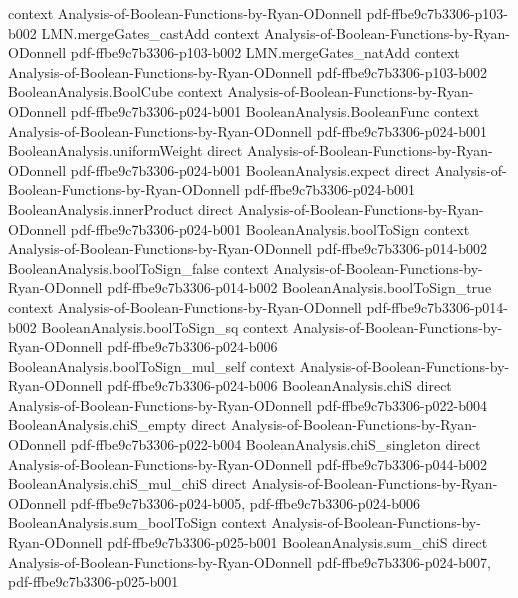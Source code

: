 \begin{lemma}
  {context}
  {Analysis-of-Boolean-Functions-by-Ryan-ODonnell}
  {pdf-ffbe9c7b3306-p103-b002}
\proofstep
  {LMN.mergeGates_castAdd}
  {context}
  {Analysis-of-Boolean-Functions-by-Ryan-ODonnell}
  {pdf-ffbe9c7b3306-p103-b002}
\proofstep
  {LMN.mergeGates_natAdd}
  {context}
  {Analysis-of-Boolean-Functions-by-Ryan-ODonnell}
  {pdf-ffbe9c7b3306-p103-b002}
\proofstep
  {BooleanAnalysis.BoolCube}
  {context}
  {Analysis-of-Boolean-Functions-by-Ryan-ODonnell}
  {pdf-ffbe9c7b3306-p024-b001}
\proofstep
  {BooleanAnalysis.BooleanFunc}
  {context}
  {Analysis-of-Boolean-Functions-by-Ryan-ODonnell}
  {pdf-ffbe9c7b3306-p024-b001}
\proofstep
  {BooleanAnalysis.uniformWeight}
  {direct}
  {Analysis-of-Boolean-Functions-by-Ryan-ODonnell}
  {pdf-ffbe9c7b3306-p024-b001}
\proofstep
  {BooleanAnalysis.expect}
  {direct}
  {Analysis-of-Boolean-Functions-by-Ryan-ODonnell}
  {pdf-ffbe9c7b3306-p024-b001}
\proofstep
  {BooleanAnalysis.innerProduct}
  {direct}
  {Analysis-of-Boolean-Functions-by-Ryan-ODonnell}
  {pdf-ffbe9c7b3306-p024-b001}
\proofstep
  {BooleanAnalysis.boolToSign}
  {context}
  {Analysis-of-Boolean-Functions-by-Ryan-ODonnell}
  {pdf-ffbe9c7b3306-p014-b002}
\proofstep
  {BooleanAnalysis.boolToSign_false}
  {context}
  {Analysis-of-Boolean-Functions-by-Ryan-ODonnell}
  {pdf-ffbe9c7b3306-p014-b002}
\proofstep
  {BooleanAnalysis.boolToSign_true}
  {context}
  {Analysis-of-Boolean-Functions-by-Ryan-ODonnell}
  {pdf-ffbe9c7b3306-p014-b002}
\proofstep
  {BooleanAnalysis.boolToSign_sq}
  {context}
  {Analysis-of-Boolean-Functions-by-Ryan-ODonnell}
  {pdf-ffbe9c7b3306-p024-b006}
\proofstep
  {BooleanAnalysis.boolToSign_mul_self}
  {context}
  {Analysis-of-Boolean-Functions-by-Ryan-ODonnell}
  {pdf-ffbe9c7b3306-p024-b006}
\proofstep
  {BooleanAnalysis.chiS}
  {direct}
  {Analysis-of-Boolean-Functions-by-Ryan-ODonnell}
  {pdf-ffbe9c7b3306-p022-b004}
\proofstep
  {BooleanAnalysis.chiS_empty}
  {direct}
  {Analysis-of-Boolean-Functions-by-Ryan-ODonnell}
  {pdf-ffbe9c7b3306-p022-b004}
\proofstep
  {BooleanAnalysis.chiS_singleton}
  {direct}
  {Analysis-of-Boolean-Functions-by-Ryan-ODonnell}
  {pdf-ffbe9c7b3306-p044-b002}
\proofstep
  {BooleanAnalysis.chiS_mul_chiS}
  {direct}
  {Analysis-of-Boolean-Functions-by-Ryan-ODonnell}
  {pdf-ffbe9c7b3306-p024-b005,
    pdf-ffbe9c7b3306-p024-b006}
\proofstep
  {BooleanAnalysis.sum_boolToSign}
  {context}
  {Analysis-of-Boolean-Functions-by-Ryan-ODonnell}
  {pdf-ffbe9c7b3306-p025-b001}
\proofstep
  {BooleanAnalysis.sum_chiS}
  {direct}
  {Analysis-of-Boolean-Functions-by-Ryan-ODonnell}
  {pdf-ffbe9c7b3306-p024-b007,
    pdf-ffbe9c7b3306-p025-b001}

\end{lemma}

